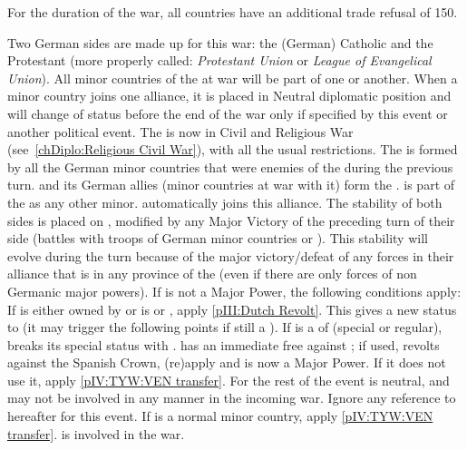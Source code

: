 \phevnt
\aparag For the duration of the war, all countries have an additional trade
refusal of 150\ducats.
\begin{digressions}


  \aparag Two German sides are made up for this war: the (German) Catholic
  \ligue and the Protestant \alliance (more properly called: \emph{Protestant
    Union} or \emph{League of Evangelical Union}).  All minor countries of the
  \HRE at war will be part of one or another. When a minor country joins one
  alliance, it is placed in Neutral diplomatic position and will change of
  status before the end of the war only if specified by this event or another
  political event. The \HRE is now in Civil and Religious War
  (see~\ref{chDiplo:Religious Civil War}), with all the usual restrictions.
  \bparag The \alliance is formed by all the German minor countries that were
  enemies of the \HAB during the previous turn.
  \bparag \HAB and its German allies (minor countries at war with it) form the
  \ligue. \AUSMin is part of the \ligue as any other minor. \paysBaviere
  automatically joins this alliance.
  \bparag The stability of both sides is placed on , modified by any
  Major Victory of the preceding turn of their side (battles with troops of
  German minor countries or \HAB).  This stability will evolve during the turn
  because of the major victory/defeat of any forces in their alliance that is
  in any province of the \HRE (even if there are only forces of non Germanic
  major powers).
   If \HOL is not a Major Power, the
  following conditions apply:
  \bparag If \payshollande is either owned by \SPA or is \paysprovincesne or
  \paysVhollande, apply \ref{pIII:Dutch Revolt}. This gives a new status to
  \payshollande (it may trigger the following points if still a \MIN).
  \bparag If \payshollande is a \VASSAL of \SPA (special or regular),
  \payshollande breaks its special status with \SPA. \SPA has an immediate
  free \CB against \payshollande ; if used, \payshollande revolts against the
  Spanish Crown, (re)apply  and \HOL is now a
  Major Power. If it does not use it, apply \ref{pIV:TYW:VEN transfer}. For
  the rest of the event \HOLhol is neutral, and may not be involved in any
  manner in the incoming war. Ignore any reference to \HOLhol hereafter for
  this event.
  \bparag If \payshollande is a normal minor country, apply \ref{pIV:TYW:VEN
    transfer}. \HOLhol is involved in the war.

\end{digressions}

